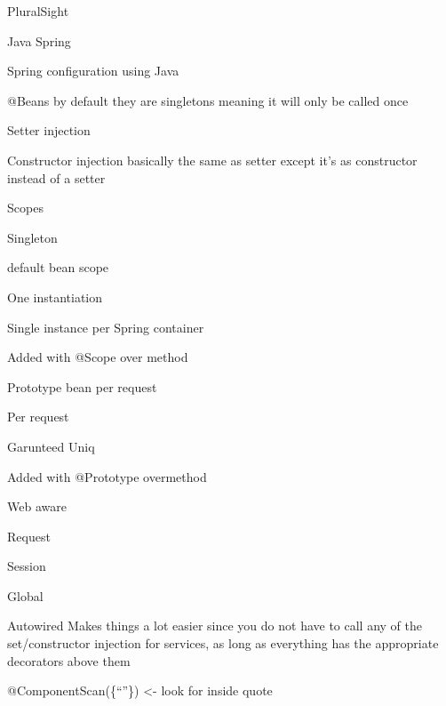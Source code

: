 \documentclass[presentation]{beamer}
\begin{document}
\begin{frame}[label={sec:org34d6546}]{PluralSight}
\begin{block}{Java Spring}
\begin{block}{Spring configuration using Java}
\begin{block}{@Beans}
by default they are singletons meaning it will only be called once
\end{block}
\begin{block}{Setter injection}
\end{block}
\begin{block}{Constructor injection}
basically the same as setter except it's as constructor instead of a setter
\end{block}
\end{block}
\begin{block}{Scopes}
\begin{block}{Singleton}
\begin{block}{default bean scope}
\end{block}
\begin{block}{One instantiation}
\end{block}
\begin{block}{Single instance per Spring container}
\end{block}
\begin{block}{Added with @Scope over method}
\end{block}
\end{block}
\begin{block}{Prototype}
bean per request
\begin{block}{Per request}
\end{block}
\begin{block}{Garunteed Uniq}
\end{block}
\begin{block}{Added with @Prototype overmethod}
\end{block}
\end{block}
\begin{block}{Web aware}
\begin{block}{Request}
\end{block}
\begin{block}{Session}
\end{block}
\begin{block}{Global}
\end{block}
\end{block}
\end{block}
\begin{block}{Autowired}
Makes things a lot easier since you do not have to call any of the set/constructor injection for services, as long as everything has the appropriate decorators above them
\begin{block}{@ComponentScan(\{``''\}) <- look for inside quote}
\end{block}

\end{block}
\end{block}
\end{frame}
\end{document}
